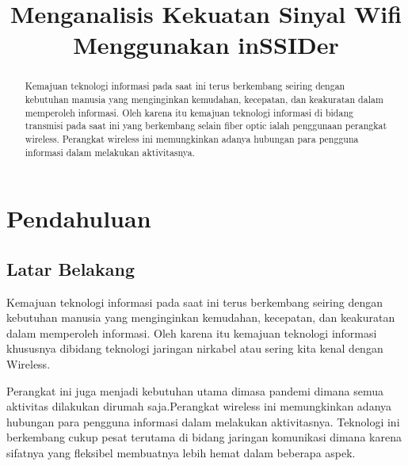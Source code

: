\documentclass[conference]{IEEEtran}
\begin{document}
\title{Menganalisis Kekuatan Sinyal Wifi Menggunakan inSSIDer\\

}

\author{


}

\maketitle

\begin{abstract}
    Kemajuan teknologi informasi pada saat ini terus berkembang seiring dengan kebutuhan manusia yang menginginkan kemudahan, kecepatan, dan keakuratan dalam memperoleh informasi.
    Oleh karena itu kemajuan teknologi informasi di bidang transmisi pada saat ini yang berkembang selain fiber optic ialah penggunaan perangkat wireless.
    Perangkat wireless ini memungkinkan adanya hubungan para pengguna informasi dalam melakukan aktivitasnya.
 
\end{abstract}


\section{Pendahuluan}

\subsection{Latar Belakang}
Kemajuan teknologi informasi pada saat ini terus berkembang seiring dengan kebutuhan manusia yang menginginkan kemudahan, kecepatan, dan keakuratan dalam memperoleh informasi. 
Oleh karena itu kemajuan teknologi informasi khususnya dibidang teknologi jaringan nirkabel atau sering kita kenal dengan Wireless.
\vspace{1pt}

Perangkat ini juga menjadi kebutuhan utama dimasa pandemi dimana semua aktivitas dilakukan dirumah saja.Perangkat wireless ini memungkinkan adanya hubungan para pengguna informasi dalam melakukan aktivitasnya.
Teknologi ini berkembang cukup pesat terutama di bidang jaringan komunikasi dimana karena sifatnya yang fleksibel 
membuatnya lebih hemat dalam beberapa aspek.
\end{document}
